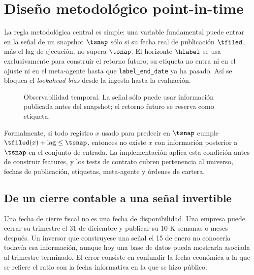 \chapter{Diseño metodológico point-in-time}
\label{chap:metodologia}

La regla metodológica central es simple: una variable fundamental puede entrar en la señal de un
snapshot \(\tsnap\) sólo si su fecha real de publicación \(\tfiled\), más el lag de ejecución, no
supera \(\tsnap\). El horizonte \(\hlabel\) se usa exclusivamente para construir el retorno futuro;
su etiqueta no entra ni en el ajuste ni en el meta-agente hasta que \texttt{label\_end\_date} ya ha
pasado. Así se bloquea el \textit{lookahead bias} desde la ingesta hasta la evaluación.

\begin{figure}[H]
\centering
{}
\caption{Observabilidad temporal. La señal sólo puede usar información publicada antes del
snapshot; el retorno futuro se reserva como etiqueta.}
\end{figure}

Formalmente, si todo registro $x$ usado para predecir en \(\tsnap\) cumple
\(\tfiled(x)+\mathrm{lag}\leq\tsnap\), entonces no existe $x$ con información posterior a
\(\tsnap\) en el conjunto de entrada. La implementación aplica esta condición antes de construir
features, y los tests de contrato cubren pertenencia al universo, fechas de publicación, etiquetas,
meta-agente y órdenes de cartera.

\section{De un cierre contable a una señal invertible}

Una fecha de cierre fiscal no es una fecha de disponibilidad. Una empresa puede cerrar su trimestre
el 31 de diciembre y publicar su 10-K semanas o meses después. Un inversor que construyese una señal
el 15 de enero no conocería todavía esa información, aunque hoy una base de datos pueda mostrarla
asociada al trimestre terminado. El error consiste en confundir la fecha económica a la que se
refiere el ratio con la fecha informativa en la que se hizo público.

